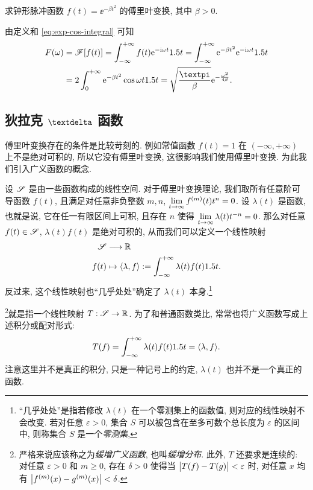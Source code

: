 \begin{example}
  求钟形脉冲函数 $f(t)=\ee^{-\beta t^2}$ 的傅里叶变换, 其中 $\beta>0$.
\end{example}

\begin{solution}
  由定义和 \ref{eq:exp-cos-integral} 可知
  \begin{align*}
    F(\omega)&=\msf[f(t)]=\intff f(t)\ee^{-\ii \omega t}\d t
    =\intff \ee^{-\beta t^2}\ee^{-\ii \omega t}\d t\\
    &=2\intf \ee^{-\beta t^2}\cos \omega t\d t
    =\sqrt{\frac\cpi\beta}\ee^{-\frac{\omega^2}{4\beta}}.
  \end{align*}
\end{solution}


\subsection{狄拉克 \texorpdfstring{$\dirac$}{δ} 函数}

傅里叶变换存在的条件是比较苛刻的.
例如常值函数 $f(t)=1$ 在 $(-\infty,+\infty)$ 上不是绝对可积的, 所以它没有傅里叶变换, 这很影响我们使用傅里叶变换.
为此我们引入广义函数的概念.

设 $\mathscr{S}$ 是由一些函数构成的线性空间.
对于傅里叶变换理论, 我们取所有任意阶可导函数 $f(t)$, 且满足对任意非负整数 $m,n$, $\lim\limits_{t\rightarrow\infty}f^{(m)}(t)t^n=0$.
设 $\lambda(t)$ 是函数, 也就是说, 它在任一有限区间上可积, 且存在 $n$ 使得 $\lim\limits_{t\rightarrow\infty}\lambda(t)t^{-n}=0$.
那么对任意 $f(t)\in\mathscr{S}$, $\lambda(t)f(t)$ 是绝对可积的, 从而我们可以定义一个线性映射
\begin{equation}
  \label{eq:linear-functional-function}
  \begin{aligned}
    \mathscr{S}&\longrightarrow {\mathbb{R}}\\
    f(t)&\mapsto \langle{\lambda,f}\rangle:=\displaystyle\int_{-\infty}^{+\infty} \lambda(t)f(t)1.5 t.
  \end{aligned}
\end{equation}
反过来, 这个线性映射也``几乎处处''确定了 $\lambda(t)$ 本身.\footnote{
  ``几乎处处''是指若修改 $\lambda(t)$ 在一个零测集上的函数值, 则对应的线性映射不会改变.
  若对任意 $\varepsilon>0$, 集合 $S$ 可以被包含在至多可数个总长度为 $\varepsilon$ 的区间中, 则称集合 $S$ 是一个\emph{零测集}, 
}

\footnote{
  严格来说应该称之为\emph{缓增广义函数}, 也叫\emph{缓增分布}. 此外, $T$ 还要求是连续的: 对任意 $\varepsilon>0$ 和 $m\ge0$, 存在 $\delta>0$ 使得当 $\bigl\vert T(f)-T(g)\bigr\vert<\varepsilon$ 时, 对任意 $x$ 均有 $\bigl\vert f^{(m)}(x)-g^{(m)}(x)\bigr\vert<\delta$.
}就是指一个线性映射 $T:\mathscr{S}\rightarrow {\mathbb{R}}$.
为了和普通函数类比, 常常也将广义函数写成上述积分或配对形式:
\[
  T(f)=\displaystyle\int_{-\infty}^{+\infty} \lambda(t)f(t)1.5 t=\langle{\lambda,f}\rangle.
\]
注意这里并不是真正的积分, 只是一种记号上的约定, $\lambda(t)$ 也并不是一个真正的函数.

